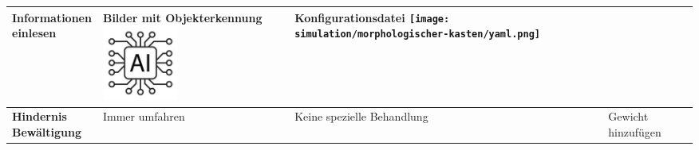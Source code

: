 \documentclass[../main.tex]{subfiles}
\begin{document}
\begin{table}[htbp]
\begin{tabularx}{\textwidth}{| X | Y | Y | Y |}
        \textbf{Informationen \newline einlesen}  &     
        Bilder mit Objekterkennung \newline
        \includegraphics[width=2.5cm]{img/simulation/morphologischer-kasten/ai-logo.jpg}
        &
        Konfigurationsdatei \newline
        \texttt{[image: simulation/morphologischer-kasten/yaml.png]}
        &
        \\ \hline
        
        \textbf{Hindernis \newline Bewältigung}   &     
        Immer umfahren &
        Keine spezielle Behandlung &
        Gewicht hinzufügen
        \\ \hline
    \end{tabularx}
\end{table}
\end{document}
